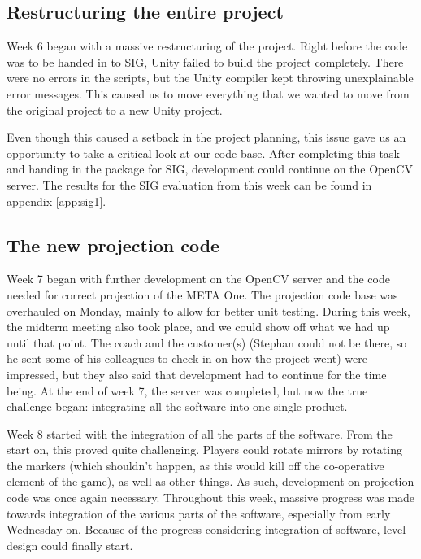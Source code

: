 		\subsection{Restructuring the entire project}
			Week 6 began with a massive restructuring of the project. Right before
			the code was to be handed in to SIG, Unity failed to build the project
			completely. There were no errors in the scripts, but the Unity compiler
			kept throwing unexplainable error messages. This caused us to move 
			everything that we wanted to move from the original project to a new
			Unity project.
			
			Even though this caused a setback in the project planning, this issue
			gave us an opportunity to take a critical look at our code base. After
			completing this task and handing in the package for SIG, development 
			could continue on the OpenCV server. The results for the SIG evaluation
			from this week can be found in appendix \ref{app:sig1}.
		
		\subsection{The new projection code}
			Week 7 began with further development on the OpenCV server and the code
			needed for correct projection of the META One. The projection code base
			was overhauled on Monday, mainly to allow for better unit testing. During
			this week, the midterm meeting also took place, and we could show off
			what we had up until that point. The coach and the customer(s) (Stephan
			could not be there, so he sent some of his colleagues to check in on
			how the project went) were impressed, but they also said that development
			had to continue for the time being. At the end of week 7, the server was
			completed, but now the true challenge began: integrating all the software
			into one single product.
			
			Week 8 started with the integration of all the parts of the software.
			From the start on, this proved quite challenging. Players could rotate
			mirrors by rotating the markers (which shouldn't happen, as this would
			kill off the co-operative element of the game), as well as other things.
			As such, development on projection code was once again necessary.
			Throughout this week, massive progress was made towards integration of 
			the various parts of the software, especially from early Wednesday on.
			Because of the progress considering integration of software, level design
			could finally start.
		 
